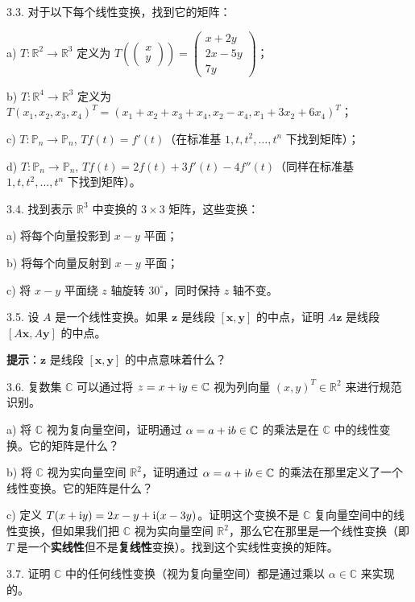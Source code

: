 3.3. 对于以下每个线性变换，找到它的矩阵：

a) $T: \mathbb{R}^2 \to \mathbb{R}^3$ 定义为 $T(\begin{pmatrix} x \\ y \end{pmatrix}) = \begin{pmatrix} x + 2y \\ 2x - 5y \\ 7y \end{pmatrix}$；

b) $T: \mathbb{R}^4 \to \mathbb{R}^3$ 定义为 $T(x_1, x_2, x_3, x_4)^T = (x_1 + x_2 + x_3 + x_4, x_2 - x_4, x_1 + 3x_2 + 6x_4)^T$；

c) $T: \mathbb{P}_n \to \mathbb{P}_n$, $T f(t) = f'(t)$（在标准基 $1, t, t^2, \dots, t^n$ 下找到矩阵）；

d) $T: \mathbb{P}_n \to \mathbb{P}_n$, $T f(t) = 2 f(t) + 3 f'(t) - 4 f''(t)$（同样在标准基 $1, t, t^2, \dots, t^n$ 下找到矩阵）。

3.4. 找到表示 $\mathbb{R}^3$ 中变换的 $3 \times 3$ 矩阵，这些变换：

a) 将每个向量投影到 $x-y$ 平面；

b) 将每个向量反射到 $x-y$ 平面；

c) 将 $x-y$ 平面绕 $z$ 轴旋转 $30^\circ$，同时保持 $z$ 轴不变。

3.5. 设 $A$ 是一个线性变换。如果 $\mathbf{z}$ 是线段 $[\mathbf{x}, \mathbf{y}]$ 的中点，证明 $A \mathbf{z}$ 是线段 $[A \mathbf{x}, A \mathbf{y}]$ 的中点。

\textbf{提示}：$\mathbf{z}$ 是线段 $[\mathbf{x}, \mathbf{y}]$ 的中点意味着什么？

3.6. 复数集 $\mathbb{C}$ 可以通过将 $z = x + {\rm i}  y \in \mathbb{C}$ 视为列向量 $(x, y)^T \in \mathbb{R}^2$ 来进行规范识别。

a) 将 $\mathbb{C}$ 视为复向量空间，证明通过 $\alpha = a + {\rm i} b \in \mathbb{C}$ 的乘法是在 $\mathbb{C}$ 中的线性变换。它的矩阵是什么？

b) 将 $\mathbb{C}$ 视为实向量空间 $\mathbb{R}^2$，证明通过 $\alpha = a + {\rm i} b \in \mathbb{C}$ 的乘法在那里定义了一个线性变换。它的矩阵是什么？

c) 定义 $T(x + {\rm i} y) = 2x - y + {\rm i} (x - 3y)$。证明这个变换不是 $\mathbb{C}$ 复向量空间中的线性变换，但如果我们把 $\mathbb{C}$ 视为实向量空间 $\mathbb{R}^2$，那么它在那里是一个线性变换（即 $T$ 是一个\textbf{实线性}但不是\textbf{复线性}变换）。找到这个实线性变换的矩阵。

3.7. 证明 $\mathbb{C}$ 中的任何线性变换（视为复向量空间）都是通过乘以 $\alpha \in \mathbb{C}$ 来实现的。


